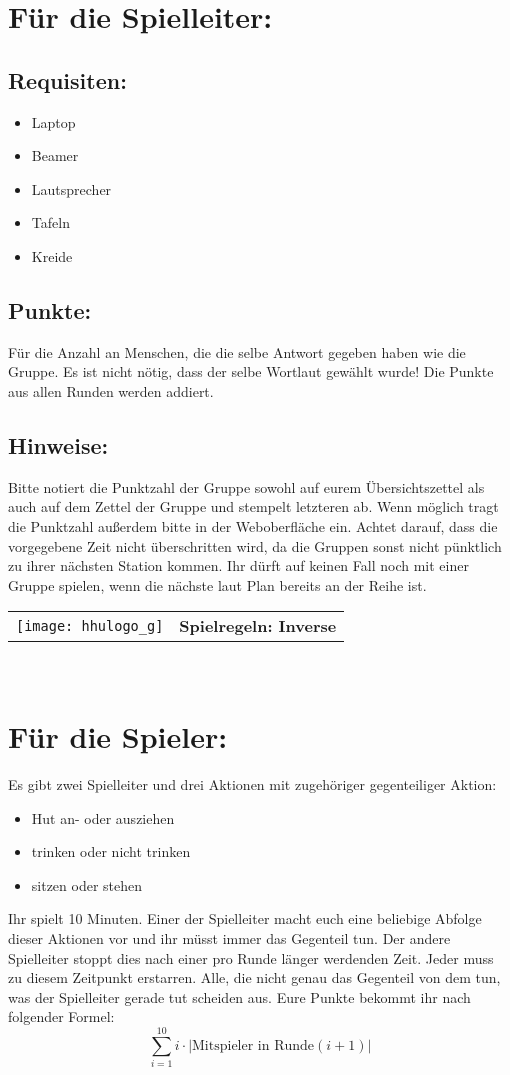 \documentclass[a4paper,10pt]{article}
\def\spiele{Inverse}
\newcommand{\unten}{
 Bitte notiert die Punktzahl der Gruppe sowohl auf eurem Übersichtszettel als auch auf dem Zettel der Gruppe und stempelt letzteren ab. Wenn möglich tragt die Punktzahl außerdem bitte in der Weboberfläche ein.
 Achtet darauf, dass die vorgegebene Zeit nicht überschritten wird, da die Gruppen sonst nicht pünktlich zu ihrer nächsten Station kommen. Ihr dürft auf keinen Fall noch mit einer Gruppe spielen, wenn die nächste laut Plan bereits an der Reihe ist.
}
\begin{document}
\section*{Für die Spielleiter:}
\subsection*{Requisiten:} 
\begin{itemize}
 \item Laptop
 \item Beamer
 \item Lautsprecher
 \item Tafeln
 \item Kreide
\end{itemize}

\subsection*{Punkte:}
Für die Anzahl an Menschen, die die selbe Antwort gegeben haben wie die Gruppe. Es ist nicht nötig, dass der selbe Wortlaut gewählt wurde! Die Punkte aus allen Runden werden addiert. 

\subsection*{Hinweise:}
\unten

\newpage


  \begin{tabularx}{\textwidth}{lc}
    \texttt{[image: hhulogo\_g]}
  & {\Huge \textbf{Spielregeln: \spiele}}
  \end{tabularx}\\

\Large
\section*{Für die Spieler:}
Es gibt zwei Spielleiter und drei Aktionen mit zugehöriger gegenteiliger Aktion: 
\begin{itemize}
 \item Hut an- oder ausziehen
 \item trinken oder nicht trinken
 \item sitzen oder stehen
\end{itemize}
Ihr spielt 10 Minuten. Einer der Spielleiter macht euch eine beliebige Abfolge dieser Aktionen vor und ihr müsst immer das Gegenteil tun. Der andere Spielleiter stoppt dies nach einer pro Runde länger werdenden Zeit. Jeder muss zu diesem Zeitpunkt erstarren. Alle, die nicht genau das Gegenteil von dem tun, was der Spielleiter gerade tut scheiden aus. Eure Punkte bekommt ihr nach folgender Formel:\\
$$\sum\limits_{i=1}^{10}i \cdot |\mbox{Mitspieler in Runde}  (i+1)|$$
\end{document}
